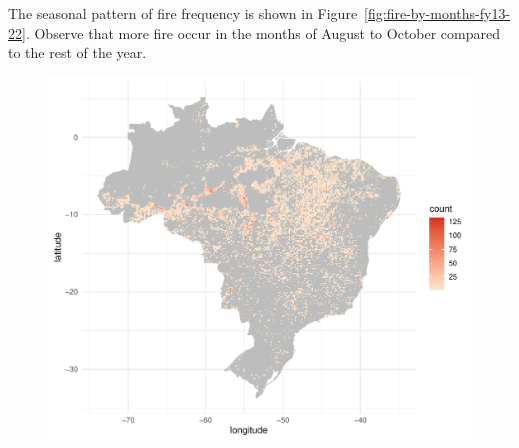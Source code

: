 \documentclass{article}\usepackage[]{graphicx}\usepackage[]{xcolor}
\makeatletter
\def\maxwidth{ %
  \ifdim\Gin@nat@width>\linewidth
    \linewidth
  \else
    \Gin@nat@width
  \fi
}
\newenvironment{knitrout}{}{} %
\numberwithin{equation}{section}
\makeatother
\begin{document}
\noindent
The seasonal pattern of fire frequency is shown in Figure~\ref{fig:fire-by-months-fy13-22}. Observe that more fire occur in the months of August to October compared to the rest of the year.









\begin{figure}[htbp]
  \centering
  \begin{minipage}[b]{0.48\linewidth}
\begin{knitrout}\scriptsize
{}\color{fgcolor}

{\centering \includegraphics[width=\maxwidth]{figure/beamer-spacetime-fy22-1} 

}



\end{knitrout}
\end{minipage}
\end{figure}
\end{document}
